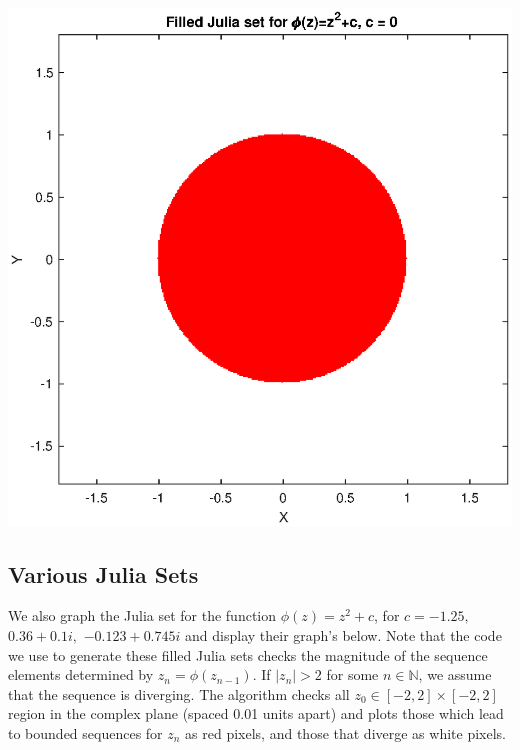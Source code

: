 \documentclass[12pt]{article}
\def\N{\mathbb{N}}
\begin{document}
				
		
			\begin{center}
			\includegraphics[width=0.5\linewidth]{JSC1}
			\end{center}
	
\subsection{Various Julia Sets} \label{prob2}	
	
	We also graph the Julia set for the function $\phi(z)=z^2+c$, for $c=-1.25,$ $0.36+0.1i,$ $-0.123+0.745i$ and display their graph's below. Note that the code we use to generate these filled Julia sets checks the magnitude of the sequence elements determined by $z_n=\phi(z_{n-1})$. If $|z_n|>2$ for some $n\in \N$, we assume that the sequence is diverging. The algorithm checks all $z_0 \in [-2,2] \times [-2,2]$ region in the complex plane (spaced 0.01 units apart) and plots those which lead to bounded sequences for $z_n$ as red pixels, and those that diverge as white pixels. 


	
		
\end{document}
